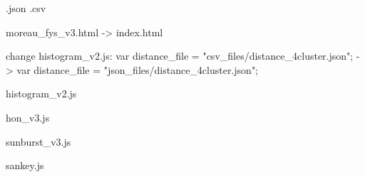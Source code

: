 .json
.csv


moreau_fys_v3.html -> index.html

change histogram_v2.js:
var distance_file = "csv_files/distance_4cluster.json";
->
var distance_file = "json_files/distance_4cluster.json";


histogram_v2.js

hon_v3.js

sunburst_v3.js

sankey.js
